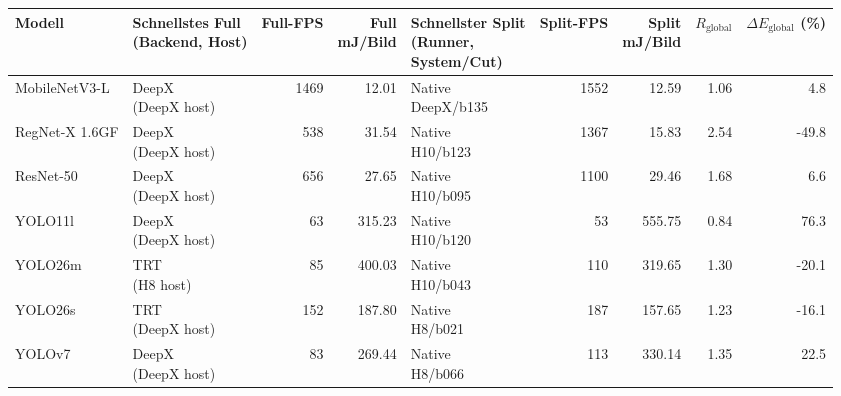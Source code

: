 \begin{tabular}{l l r r l r r r r}
\toprule
Modell & \shortstack{Schnellstes Full\\(Backend, Host)} & Full-FPS & \shortstack{Full\\mJ/Bild} & \shortstack{Schnellster Split\\(Runner,\\System/Cut)} & Split-FPS & \shortstack{Split\\mJ/Bild} & $R_{\mathrm{global}}$ & \shortstack{$\Delta E_{\mathrm{global}}$\\(\%)} \\
\midrule
MobileNetV3-L & \shortstack[l]{DeepX\\(DeepX host)} & 1469 & 12.01 & \shortstack[l]{Native\\DeepX/b135} & 1552 & 12.59 & 1.06 & 4.8 \\
RegNet-X 1.6GF & \shortstack[l]{DeepX\\(DeepX host)} & 538 & 31.54 & \shortstack[l]{Native\\H10/b123} & 1367 & 15.83 & 2.54 & -49.8 \\
ResNet-50 & \shortstack[l]{DeepX\\(DeepX host)} & 656 & 27.65 & \shortstack[l]{Native\\H10/b095} & 1100 & 29.46 & 1.68 & 6.6 \\
YOLO11l & \shortstack[l]{DeepX\\(DeepX host)} & 63 & 315.23 & \shortstack[l]{Native\\H10/b120} & 53 & 555.75 & 0.84 & 76.3 \\
YOLO26m & \shortstack[l]{TRT\\(H8 host)} & 85 & 400.03 & \shortstack[l]{Native\\H10/b043} & 110 & 319.65 & 1.30 & -20.1 \\
YOLO26s & \shortstack[l]{TRT\\(DeepX host)} & 152 & 187.80 & \shortstack[l]{Native\\H8/b021} & 187 & 157.65 & 1.23 & -16.1 \\
YOLOv7 & \shortstack[l]{DeepX\\(DeepX host)} & 83 & 269.44 & \shortstack[l]{Native\\H8/b066} & 113 & 330.14 & 1.35 & 22.5 \\
\bottomrule
\end{tabular}
\endgroup
